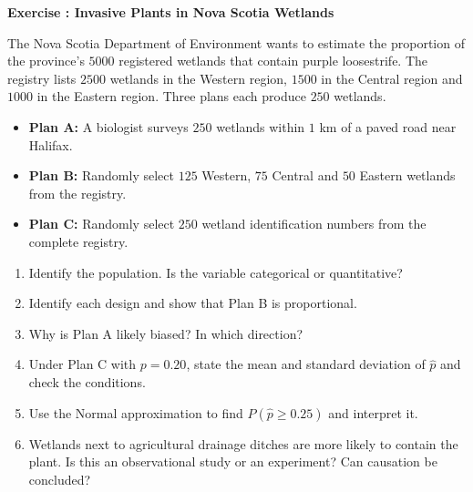 \documentclass[11pt]{article}
\newcounter{exercise}
\newcommand{\exercise}[1]{%
  \par\medskip
  \refstepcounter{exercise}%
  {\large\bfseries\color{CourseBlue} Exercise \theexercise: #1}\par\smallskip}
\begin{document}
\exercise{Invasive Plants in Nova Scotia Wetlands}

The Nova Scotia Department of Environment wants to estimate the proportion of the province's $5000$ registered wetlands that contain purple loosestrife. The registry lists $2500$ wetlands in the Western region, $1500$ in the Central region and $1000$ in the Eastern region. Three plans each produce $250$ wetlands.

\begin{itemize}[itemsep=0.1em]
  \item \textbf{Plan A:} A biologist surveys $250$ wetlands within $1$ km of a paved road near Halifax.
  \item \textbf{Plan B:} Randomly select $125$ Western, $75$ Central and $50$ Eastern wetlands from the registry.
  \item \textbf{Plan C:} Randomly select $250$ wetland identification numbers from the complete registry.
\end{itemize}

\begin{enumerate}
  \item Identify the population. Is the variable categorical or quantitative?
  \item Identify each design and show that Plan B is proportional.
  \item Why is Plan A likely biased? In which direction?
  \item Under Plan C with $p=0.20$, state the mean and standard deviation of $\hat p$ and check the conditions.
  \item Use the Normal approximation to find $P(\hat p\geq0.25)$ and interpret it.
  \item Wetlands next to agricultural drainage ditches are more likely to contain the plant. Is this an observational study or an experiment? Can causation be concluded?
\end{enumerate}
\end{document}

